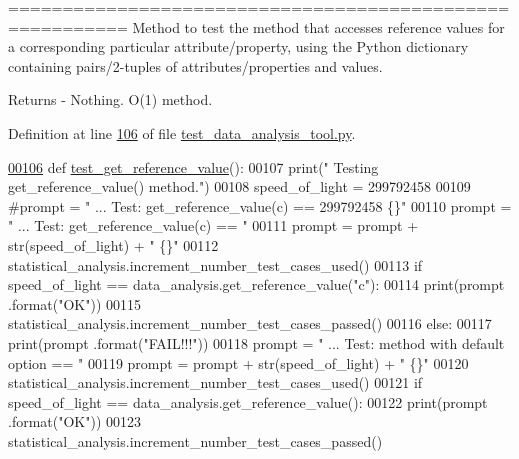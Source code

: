 ========================================================= Method to test the method that accesses reference values for a corresponding particular attribute/property, using the Python dictionary containing pairs/2-\/tuples of attributes/properties and values. 

\begin{DoxyReturn}{Returns}
-\/ Nothing. O(1) method. 
\end{DoxyReturn}


Definition at line \hyperlink{test__data__analysis__tool_8py_source_l00106}{106} of file \hyperlink{test__data__analysis__tool_8py_source}{test\+\_\+data\+\_\+analysis\+\_\+tool.\+py}.


\begin{DoxyCode}
\hypertarget{classstatistics_1_1test__data__analysis__tool_1_1data__analysis__tester_l00106}{}\hyperlink{classstatistics_1_1test__data__analysis__tool_1_1data__analysis__tester_ac5dee1d2f7bb003c3b322ec9692766af}{00106}     \textcolor{keyword}{def }\hyperlink{classstatistics_1_1test__data__analysis__tool_1_1data__analysis__tester_ac5dee1d2f7bb003c3b322ec9692766af}{test\_get\_reference\_value}():
00107         print(\textcolor{stringliteral}{" Testing get\_reference\_value() method."})
00108         speed\_of\_light = 299792458
00109         \textcolor{comment}{#prompt = " ... Test: get\_reference\_value(c) == 299792458       \{\}"}
00110         prompt = \textcolor{stringliteral}{"  ... Test: get\_reference\_value(c) == "}
00111         prompt = prompt + str(speed\_of\_light) + \textcolor{stringliteral}{"       \{\}"}
00112         statistical\_analysis.increment\_number\_test\_cases\_used()
00113         \textcolor{keywordflow}{if} speed\_of\_light == data\_analysis.get\_reference\_value(\textcolor{stringliteral}{"c"}):
00114             print(prompt .format(\textcolor{stringliteral}{"OK"}))
00115             statistical\_analysis.increment\_number\_test\_cases\_passed()
00116         \textcolor{keywordflow}{else}:
00117             print(prompt .format(\textcolor{stringliteral}{"FAIL!!!"}))
00118         prompt = \textcolor{stringliteral}{"  ... Test: method with default option == "}
00119         prompt = prompt + str(speed\_of\_light) + \textcolor{stringliteral}{"   \{\}"}
00120         statistical\_analysis.increment\_number\_test\_cases\_used()
00121         \textcolor{keywordflow}{if} speed\_of\_light == data\_analysis.get\_reference\_value():
00122             print(prompt .format(\textcolor{stringliteral}{"OK"}))
00123             statistical\_analysis.increment\_number\_test\_cases\_passed()

\end{DoxyCode}
